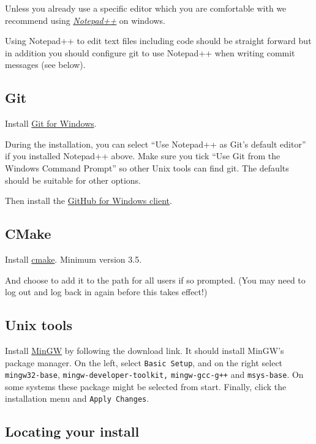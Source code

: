 Unless you already use a specific editor which you are comfortable with
we recommend using
\href{http://notepad-plus-plus.org/}{\emph{Notepad++}} on windows.

Using Notepad++ to edit text files including code should be straight
forward but in addition you should configure git to use Notepad++ when
writing commit messages (see below).

\subsection{Git}\label{git-2}

Install \href{http://gitforwindows.org/}{Git for Windows}.

During the installation, you can select ``Use Notepad++ as Git's default
editor'' if you installed Notepad++ above. Make sure you tick ``Use Git
from the Windows Command Prompt'' so other Unix tools can find git. The
defaults should be suitable for other options.

Then install the \href{http://windows.github.com/}{GitHub for Windows
client}.

\subsection{CMake}\label{cmake-2}

Install
\href{http://www.cmake.org/cmake/resources/software.html}{cmake}.
Minimum version 3.5.

And choose to add it to the path for all users if so prompted. (You may
need to log out and log back in again before this takes effect!)

\subsection{Unix tools}\label{unix-tools}

Install \href{http://sourceforge.net/projects/mingw/}{MinGW} by
following the download link. It should install MinGW's package manager.
On the left, select \texttt{Basic Setup}, and on the right select
\texttt{mingw32-base}, \texttt{mingw-developer-toolkit,}
\texttt{mingw-gcc-g++} and \texttt{msys-base}. On some systems these
package might be selected from start. Finally, click the installation
menu and \texttt{Apply Changes}.

\subsection{Locating your install}\label{locating-your-install}

